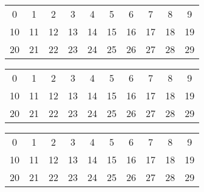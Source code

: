 \documentclass[12pt, a4paper, titlepage,twoside]{article}
\begin{document}
	 		\vspace{8mm}
	  		\begin{tabular}{|c|c|c|c|c|c|c|c|c|c|}
		 			\hline	 		 			
		 		\cellcolor{red}0  & \cellcolor{red} 1 &  2 &  3 & \cellcolor{red}4 &  5 & \cellcolor{red} 6 &  7 & \cellcolor{red} 8 &  \cellcolor{red}9 \\
	 		 	\cellcolor{red}10 & 11 & \cellcolor{red}12 & 13 & \cellcolor{red}14 & \cellcolor{red}15 & \cellcolor{red}16 & 17 & \cellcolor{red}18 & 19 \\
	 		 	\cellcolor{red}20 & \cellcolor{red}21 & \cellcolor{red}22 & 23 & \cellcolor{red}24 & 25 & \cellcolor{red}26 & \cellcolor{red}27 & \cellcolor{red}28 & 29 \\
	 		 	\hline
	 		\end{tabular}
	 		
			\vspace{8mm}
			\begin{tabular}{|c|c|c|c|c|c|c|c|c|c|}
				\hline	 		 			
				\cellcolor{red}0  & \cellcolor{red} 1 &  2 &  3 & \cellcolor{red}4 &  5 & \cellcolor{red} 6 &  7 & \cellcolor{red} 8 &  \cellcolor{red}9 \\
				\cellcolor{red}10 & 11 & \cellcolor{red}12 & 13 & \cellcolor{red}14 & \cellcolor{red}15 & \cellcolor{red}16 & 17 & \cellcolor{red}18 & 19 \\
				\cellcolor{red}20 & \cellcolor{red}21 & \cellcolor{red}22 & 23 & \cellcolor{red}24 & \cellcolor{red}25 & \cellcolor{red}26 & \cellcolor{red}27 & \cellcolor{red}28 & 29 \\
				\hline
			\end{tabular}
			
			\vspace{8mm}
			\begin{tabular}{|c|c|c|c|c|c|c|c|c|c|}
				\hline	 		 			
				\cellcolor{red}0  & \cellcolor{red} 1 &  \cellcolor{green}2 &  \cellcolor{green}3 & \cellcolor{red}4 &  \cellcolor{green}5 & \cellcolor{red} 6 &  \cellcolor{green}7 & \cellcolor{red} 8 &  \cellcolor{red}9 \\
				\cellcolor{red}10 & \cellcolor{green}11 & \cellcolor{red}12 & \cellcolor{green}13 & \cellcolor{red}14 & \cellcolor{red}15 & \cellcolor{red}16 & \cellcolor{green}17 & \cellcolor{red}18 & \cellcolor{green}19 \\
				\cellcolor{red}20 & \cellcolor{red}21 & \cellcolor{red}22 & \cellcolor{green}23 & \cellcolor{red}24 & \cellcolor{red}25 & \cellcolor{red}26 & \cellcolor{red}27 & \cellcolor{red}28 & \cellcolor{green}29 \\
				\hline
			\end{tabular}
	 	
\end{document}
